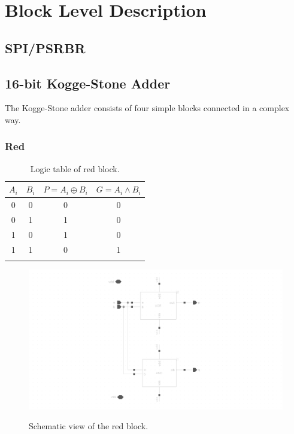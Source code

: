 \section{Block Level Description}

\subsection{SPI/PSRBR}

\subsection{16-bit Kogge-Stone Adder}
The Kogge-Stone adder consists of four simple blocks connected in a complex way.

\noindent {}

\subsubsection{Red}

\begin{table}[H]
  \caption{Logic table of red block.}
  \centering
  \begin{tabular}{cc|cc}
    \toprule
    $A_i$ & $B_i$ & $P=A_i \oplus B_i$ & $G=A_i \wedge B_i$ \\
    \midrule
    0 & 0 & 0 & 0 \\
    0 & 1 & 1 & 0 \\
    1 & 0 & 1 & 0 \\
    1 & 1 & 0 & 1 \\
    \bottomrule
    \label{tab:red}
  \end{tabular}
\end{table}

\begin{figure}[H]
  \centering
  \captionsetup{justification=centering}
  {\includegraphics[width=2.0\textwidth]{../figures/red}}
  \caption{Schematic view of the red block.} \label{fig:red}
\end{figure}


